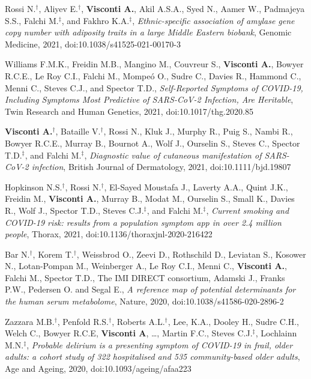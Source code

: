 \documentclass[a4paper,10pt]{article}
\begin{document}
{\begin{itemize}
	    Rossi N.$^{\textbf{$\dag $}}$, Aliyev E.$^{\textbf{$\dag $}}$, \textbf{Visconti A.}, Akil A.S.A., Syed N., Aamer W., Padmajeya S.S., Falchi M.$^{\textbf{$\ddag $}}$, and Fakhro K.A.$^{\textbf{$\ddag $}}$, \emph{Ethnic-specific association of amylase gene copy number with adiposity traits in a large Middle Eastern biobank}, Genomic Medicine, 2021, doi:10.1038/s41525-021-00170-3
		
 	   	Williams F.M.K., Freidin M.B., Mangino M., Couvreur S., \textbf{Visconti A.}, Bowyer R.C.E., Le Roy C.I., Falchi M., Mompe\'o O., Sudre C., Davies R., Hammond C., Menni C., Steves C.J., and Spector T.D., \emph{Self-Reported Symptoms of COVID-19, Including Symptoms Most Predictive of SARS-CoV-2 Infection, Are Heritable}, Twin Research and Human Genetics, 2021, doi:10.1017/thg.2020.85
		
	     \textbf{Visconti A.}$^{\textbf{$\dag $}}$, Bataille V.$^{\textbf{$\dag $}}$, Rossi N., Kluk J., Murphy R., Puig S., Nambi R., Bowyer R.C.E., Murray B., Bournot A., Wolf J., Ourselin S., Steves C., Spector T.D.$^{\textbf{$\ddag $}}$, and Falchi M.$^{\textbf{$\ddag $}}$, \emph{Diagnostic value of cutaneous manifestation of SARS-CoV-2 infection}, British Journal of Dermatology, 2021, doi:10.1111/bjd.19807
		
		 Hopkinson N.S.$^{\textbf{$\dag $}}$, Rossi N.$^{\textbf{$\dag $}}$, El-Sayed Moustafa J., Laverty A.A., Quint J.K., Freidin M., \textbf{Visconti A.}, Murray B., Modat M., Ourselin S., Small K., Davies R., Wolf J., Spector T.D., Steves C.J.$^{\textbf{$\ddag $}}$, and Falchi M.$^{\textbf{$\ddag $}}$, \emph{Current smoking and COVID-19 risk: results from a population symptom app in over 2.4 million people}, Thorax, 2021, doi:10.1136/thoraxjnl-2020-216422
		
		 Bar N.$^{\textbf{$\dag $}}$, Korem T.$^{\textbf{$\dag $}}$, Weissbrod O., Zeevi D., Rothschild D., Leviatan S., Kosower N., Lotan-Pompan M., Weinberger A., Le Roy C.I., Menni C., \textbf{Visconti A.}, Falchi M., Spector T.D., The IMI DIRECT consortium, Adamski J., Franks P.W., Pedersen O. and Segal E., \emph{A reference map of potential determinants for the human serum metabolome}, Nature, 2020, doi:10.1038/s41586-020-2896-2
		
		 Zazzara M.B.$^{\textbf{$\dag $}}$, Penfold R.S.$^{\textbf{$\dag $}}$, Roberts A.L.$^{\textbf{$\dag $}}$, Lee, K.A., Dooley H., Sudre C.H., Welch C., Bowyer R.C.E, \textbf{Visconti A}, \dots, Martin F.C., Steves C.J.$^{\textbf{$\ddag $}}$, Lochlainn M.N.$^{\textbf{$\ddag $}}$, \emph{Probable delirium is a presenting symptom of COVID-19 in frail, older adults: a cohort study of 322 hospitalised and 535 community-based older adults}, Age and Ageing, 2020, doi:10.1093/ageing/afaa223
		

\end{itemize}}
\end{document}
